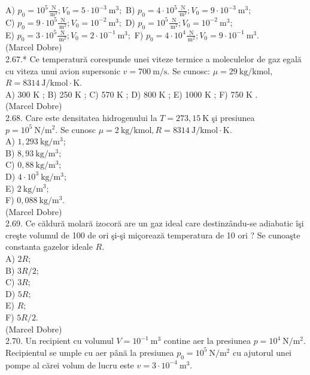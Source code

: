 A) $p_{0}=10^{5} \frac{\mathrm{~N}}{\mathrm{~m}^{2}} ; V_{0}=5 \cdot 10^{-3} \mathrm{~m}^{3} ;$ B) $p_{0}=4 \cdot 10^{5} \frac{\mathrm{~N}}{\mathrm{~m}^{2}} ; V_{0}=9 \cdot 10^{-3} \mathrm{~m}^{3}$;\\
C) $p_{0}=9 \cdot 10^{5} \frac{\mathrm{~N}}{\mathrm{~m}^{2}} ; V_{0}=10^{-2} \mathrm{~m}^{3} ;$ D) $p_{0}=10^{5} \frac{\mathrm{~N}}{\mathrm{~m}^{2}} ; V_{0}=10^{-2} \mathrm{~m}^{3} ;$\\
E) $p_{0}=3 \cdot 10^{5} \frac{\mathrm{~N}}{\mathrm{~m}^{2}} ; V_{0}=2 \cdot 10^{-1} \mathrm{~m}^{3} ;$ F) $p_{0}=4 \cdot 10^{4} \frac{\mathrm{~N}}{\mathrm{~m}^{2}} ; V_{0}=9 \cdot 10^{-1} \mathrm{~m}^{3}$.\\
(Marcel Dobre)\\
2.67.* Ce temperatură corespunde unei viteze termice a moleculelor de gaz egală cu viteza unui avion supersonic $v=700 \mathrm{~m} / \mathrm{s}$. Se cunosc: $\mu=29 \mathrm{~kg} / \mathrm{kmol}$, $R=8314 \mathrm{~J} / \mathrm{kmol} \cdot \mathrm{K}$.\\
A) 300 K ; B) 250 K ; C) 570 K ; D) 800 K ; E) 1000 K ; F) 750 K .\\
(Marcel Dobre)\\
2.68. Care este densitatea hidrogenului la $T=273,15 \mathrm{~K}$ şi presiunea $p=10^{5} \mathrm{~N} / \mathrm{m}^{2}$. Se cunosc $\mu=2 \mathrm{~kg} / \mathrm{kmol}, R=8314 \mathrm{~J} / \mathrm{kmol} \cdot \mathrm{K}$.\\
A) $1,293 \mathrm{~kg} / \mathrm{m}^{3}$;\\
B) $8,93 \mathrm{~kg} / \mathrm{m}^{3}$;\\
C) $0,88 \mathrm{~kg} / \mathrm{m}^{3}$;\\
D) $4 \cdot 10^{3} \mathrm{~kg} / \mathrm{m}^{3}$;\\
E) $2 \mathrm{~kg} / \mathrm{m}^{3}$;\\
F) $0,088 \mathrm{~kg} / \mathrm{m}^{3}$.\\
(Marcel Dobre)\\
2.69. Ce căldură molară izocoră are un gaz ideal care destinzându-se adiabatic îşi creşte volumul de 100 de ori şi-şi miçorează temperatura de 10 ori ? Se cunoaşte constanta gazelor ideale $R$.\\
A) $2 R$;\\
B) $3 R / 2$;\\
C) $3 R$;\\
D) $5 R$;\\
E) $R$;\\
F) $5 R / 2$.\\
(Marcel Dobre)\\
2.70. Un recipient cu volumul $V=10^{-1} \mathrm{~m}^{3}$ contine aer la presiunea $p=10^{4} \mathrm{~N} / \mathrm{m}^{2}$. Recipientul se umple cu aer până la presiunea $p_{0}=10^{5} \mathrm{~N} / \mathrm{m}^{2}$ cu ajutorul unei pompe al cărei volum de lucru este $v=3 \cdot 10^{-4} \mathrm{~m}^{3}$.

